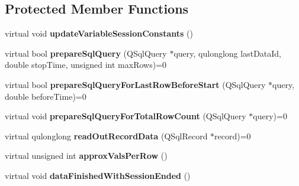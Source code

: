 \subsection*{Protected Member Functions}
\begin{DoxyCompactItemize}
\item 
\hypertarget{class_picto_1_1_analysis_data_iterator_aa7dca863071e8c7849e4e5e31662cc94}{virtual void {\bfseries update\-Variable\-Session\-Constants} ()}\label{class_picto_1_1_analysis_data_iterator_aa7dca863071e8c7849e4e5e31662cc94}

\item 
\hypertarget{class_picto_1_1_analysis_data_iterator_abda1c039bb6bf9d11807cad274fbff40}{virtual bool {\bfseries prepare\-Sql\-Query} (Q\-Sql\-Query $\ast$query, qulonglong last\-Data\-Id, double stop\-Time, unsigned int max\-Rows)=0}\label{class_picto_1_1_analysis_data_iterator_abda1c039bb6bf9d11807cad274fbff40}

\item 
\hypertarget{class_picto_1_1_analysis_data_iterator_a2ce00474e9aaf213554633df11b7da36}{virtual bool {\bfseries prepare\-Sql\-Query\-For\-Last\-Row\-Before\-Start} (Q\-Sql\-Query $\ast$query, double before\-Time)=0}\label{class_picto_1_1_analysis_data_iterator_a2ce00474e9aaf213554633df11b7da36}

\item 
\hypertarget{class_picto_1_1_analysis_data_iterator_a7875dc04bdab2c416b8efabe31768007}{virtual void {\bfseries prepare\-Sql\-Query\-For\-Total\-Row\-Count} (Q\-Sql\-Query $\ast$query)=0}\label{class_picto_1_1_analysis_data_iterator_a7875dc04bdab2c416b8efabe31768007}

\item 
\hypertarget{class_picto_1_1_analysis_data_iterator_a6496fc2866653d766946e160c242377b}{virtual qulonglong {\bfseries read\-Out\-Record\-Data} (Q\-Sql\-Record $\ast$record)=0}\label{class_picto_1_1_analysis_data_iterator_a6496fc2866653d766946e160c242377b}

\item 
\hypertarget{class_picto_1_1_analysis_data_iterator_a17bb1884078dc4f31adadb68f3190d39}{virtual unsigned int {\bfseries approx\-Vals\-Per\-Row} ()}\label{class_picto_1_1_analysis_data_iterator_a17bb1884078dc4f31adadb68f3190d39}

\item 
\hypertarget{class_picto_1_1_analysis_data_iterator_a20fa1a7ae65a6780c8030bdc92e4ba53}{virtual void {\bfseries data\-Finished\-With\-Session\-Ended} ()}\label{class_picto_1_1_analysis_data_iterator_a20fa1a7ae65a6780c8030bdc92e4ba53}


\end{DoxyCompactItemize}
